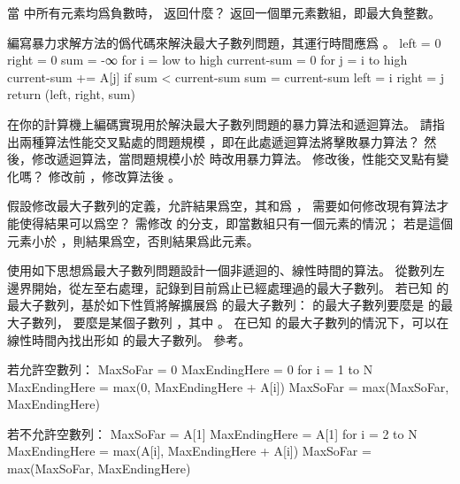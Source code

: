 \startsection[
  title={The maximum-subarray problem},
]

\startEXERCISE
當  中所有元素均爲負數時，  返回什麼？
\stopEXERCISE
\startANSWER
返回一個單元素數組，即最大負整數。
\stopANSWER

\startEXERCISE
編寫暴力求解方法的僞代碼來解決最大子數列問題，其運行時間應爲 。
\stopEXERCISE
\startANSWER
{}
\startCLRS
left = 0
right = 0
sum = -∞
for i = low to high
	current-sum = 0
	for j = i to high
	current-sum += A[j]
	if sum < current-sum
		sum = current-sum
	left = i
	right = j
return (left, right, sum)
\stopCLRS
\stopANSWER

\startEXERCISE
在你的計算機上編碼實現用於解決最大子數列問題的暴力算法和遞迴算法。
請指出兩種算法性能交叉點處的問題規模  ，即在此處遞迴算法將擊敗暴力算法？
然後，修改遞迴算法，當問題規模小於  時改用暴力算法。
修改後，性能交叉點有變化嗎？
\stopEXERCISE
\startANSWER
修改前 ，修改算法後 。
\stopANSWER

\startEXERCISE
假設修改最大子數列的定義，允許結果爲空，其和爲 ，
需要如何修改現有算法才能使得結果可以爲空？
\stopEXERCISE
\startANSWER
需修改  的分支，即當數組只有一個元素的情況；
若是這個元素小於 ，則結果爲空，否則結果爲此元素。
\stopANSWER

\startEXERCISE
使用如下思想爲最大子數列問題設計一個非遞迴的、線性時間的算法。
從數列左邊界開始，從左至右處理，記錄到目前爲止已經處理過的最大子數列。
若已知 的最大子數列，基於如下性質將解擴展爲  的最大子數列：
 的最大子數列要麼是  的最大子數列，
要麼是某個子數列 ，其中 。
在已知  的最大子數列的情況下，可以在線性時間內找出形如  的最大子數列。
\stopEXERCISE
\startANSWER
參考。

若允許空數列：
\startCLRS
MaxSoFar = 0
MaxEndingHere = 0
for i = 1 to N
	MaxEndingHere = max(0, MaxEndingHere + A[i])
	MaxSoFar = max(MaxSoFar, MaxEndingHere)
\stopCLRS

若不允許空數列：
\startCLRS
MaxSoFar = A[1]
MaxEndingHere = A[1]
for i = 2 to N
	MaxEndingHere = max(A[i], MaxEndingHere + A[i])
	MaxSoFar = max(MaxSoFar, MaxEndingHere)
\stopCLRS
\stopANSWER

\stopsection
